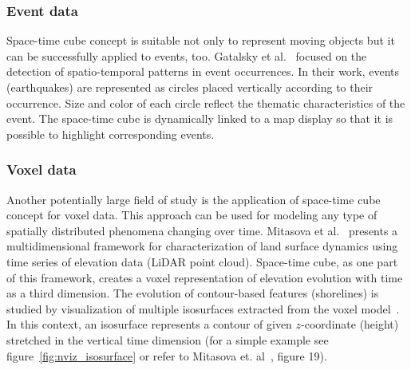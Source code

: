 \documentclass[a4paper,12pt,oneside]{book}
\begin{document}



\subsubsection{Event data}
Space-time cube concept is suitable not only to represent moving objects
but it can be successfully applied to events, too.
Gatalsky et al.~\cite{gatalsky2004interactive}
focused on the detection of spatio-temporal patterns in event occurrences.
In their work, events (earthquakes) are represented as circles placed vertically according to their occurrence.
Size and color of each circle reflect the thematic characteristics of the event.
The space-time cube is dynamically linked to a map display so that it is possible to highlight corresponding events.

\subsubsection{Voxel data}
\label{voxelHelena}
Another potentially large field of study is the application of space-time cube concept for voxel data.
This approach can be used for modeling any type of spatially distributed phenomena changing over time.
Mitasova et al.~\cite{mitasova2011landscape} presents a multidimensional framework for characterization
of land surface dynamics using time series of elevation data (LiDAR point cloud).
Space-time cube, as one part of this framework,
creates a voxel representation of elevation evolution with time as a third dimension.
The evolution of contour-based features (shorelines) is studied
by visualization of multiple isosurfaces extracted from the voxel model~\cite{mitasova2012scientific}.
In this context, an isosurface represents a contour of given $z$-coordinate (height)
stretched in the vertical time dimension (for a simple example see figure~\ref{fig:nviz_isosurface}
or refer to Mitasova et. al~\cite{mitasova2012scientific}, figure 19).
\end{document}
